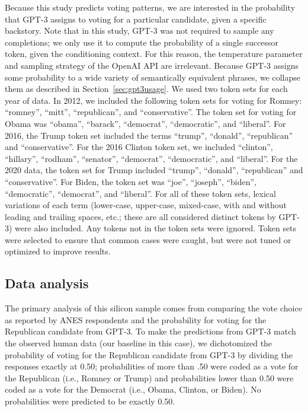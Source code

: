 \documentclass[11pt]{article}
\begin{document}
Because this study predicts voting patterns, we are interested in the probability that GPT-3 assigns to voting for a particular candidate, given a specific backstory.
Note that in this study, GPT-3 was not required to sample any completions; we only use it to compute the probability of a single successor token, given the conditioning context.  For this reason, the temperature parameter and sampling strategy of the OpenAI API are irrelevant.
Because GPT-3 assigns some probability to a wide variety of semantically equivalent phrases, we collapse them as described in Section~\ref{sec:gpt3usage}.  We used two token sets for each year of data. In 2012, we included the following token sets for voting for Romney: ``romney'', ``mitt'', ``republican'', and ``conservative''. The token set for voting for Obama was ``obama'', ``barack'', ``democrat'', ``democratic'', and ``liberal''. For 2016, the Trump token set included the terms ``trump'', ``donald'', ``republican'' and ``conservative''. For the 2016 Clinton token set, we included ``clinton'', ``hillary'', ``rodham'', ``senator'', ``democrat'', ``democratic'', and ``liberal''. For the 2020 data,  the token set for Trump included ``trump'', ``donald'', ``republican'' and ``conservative''. For Biden, the token set was ``joe'', ``joseph'', ``biden'', ``democratic'', ``democrat'', and ``liberal''.
For all of these token sets, lexical variations of each term (lower-case, upper-case, mixed-case, with and without leading and trailing spaces, etc.; these are all considered distinct tokens by GPT-3) were also included. Any tokens not in the token sets were ignored.  Token sets were selected to ensure that common cases were caught, but were not tuned or optimized to improve results.

\subsection{Data analysis}

The primary analysis of this silicon sample comes from comparing the vote choice as reported by ANES respondents and the probability for voting for the Republican candidate from GPT-3. To make the predictions from GPT-3 match the observed human data (our baseline in this case), we dichotomized the probability of voting for the Republican candidate from GPT-3 by dividing the responses exactly at 0.50; probabilities of more than .50 were coded as a vote for the Republican (i.e., Romney or Trump) and probabilities lower than 0.50 were coded as a vote for the Democrat (i.e., Obama, Clinton, or Biden). No probabilities were predicted to be exactly 0.50.
\end{document}
